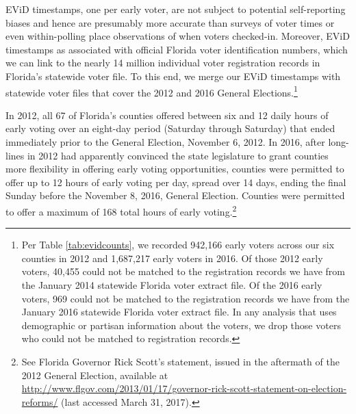 \documentclass[12pt,titlepage]{article}
\begin{document}
EViD timestamps, one per early voter, are not subject to potential
self-reporting biases and hence are presumably more accurate than
surveys of voter times or even within-polling place observations of
when voters checked-in.  Moreover, EViD timestamps as associated with
official Florida voter identification numbers, which we can link to
the nearly 14 million individual voter registration records in
Florida's statewide voter file.  To this end, we merge our EViD
timestamps with statewide voter files that cover the 2012 and 2016
General Elections.\footnote{Per Table \ref{tab:evidcounts}, we
  recorded 942,166 early voters across our six counties in 2012 and
  1,687,217 early voters in 2016.  Of those 2012 early voters, 40,455
  could not be matched to the registration records we have from the
  January 2014 statewide Florida voter extract file.  Of the 2016
  early voters, 969 could not be matched to the registration records
  we have from the January 2016 statewide Florida voter extract file.
  In any analysis that uses demographic or partisan information about
  the voters, we drop those voters who could not be matched to
  registration records.}




In 2012, all 67 of Florida's counties offered between six and 12 daily
hours of early voting over an eight-day period (Saturday through
Saturday) that ended immediately prior to the General Election,
November 6, 2012.  In 2016, after long-lines in 2012 had apparently
convinced the state legislature to grant counties more flexibility in
offering early voting opportunities, counties were permitted to offer
up to 12 hours of early voting per day, spread over 14 days, ending
the final Sunday before the November 8, 2016, General Election.
Counties were permitted to offer a maximum of 168 total hours of early
voting.\footnote{See Florida Governor Rick Scott's statement, issued
  in the aftermath of the 2012 General Election, available at
  \url{http://www.flgov.com/2013/01/17/governor-rick-scott-statement-on-election-reforms/}
  (last accessed March 31, 2017).}
\end{document}
